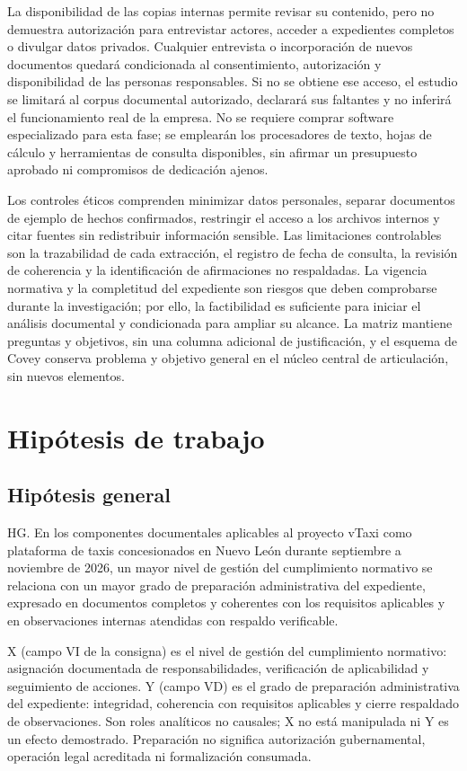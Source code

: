 {La disponibilidad de las copias internas permite revisar su contenido, pero no demuestra autorización para entrevistar actores, acceder a expedientes completos o divulgar datos privados. Cualquier entrevista o incorporación de nuevos documentos quedará condicionada al consentimiento, autorización y disponibilidad de las personas responsables. Si no se obtiene ese acceso, el estudio se limitará al corpus documental autorizado, declarará sus faltantes y no inferirá el funcionamiento real de la empresa. No se requiere comprar software especializado para esta fase; se emplearán los procesadores de texto, hojas de cálculo y herramientas de consulta disponibles, sin afirmar un presupuesto aprobado ni compromisos de dedicación ajenos.


Los controles éticos comprenden minimizar datos personales, separar documentos de ejemplo de hechos confirmados, restringir el acceso a los archivos internos y citar fuentes sin redistribuir información sensible. Las limitaciones controlables son la trazabilidad de cada extracción, el registro de fecha de consulta, la revisión de coherencia y la identificación de afirmaciones no respaldadas. La vigencia normativa y la completitud del expediente son riesgos que deben comprobarse durante la investigación; por ello, la factibilidad es suficiente para iniciar el análisis documental y condicionada para ampliar su alcance. La matriz mantiene preguntas y objetivos, sin una columna adicional de justificación, y el esquema de Covey conserva problema y objetivo general en el núcleo central de articulación, sin nuevos elementos.


\section{Hipótesis de trabajo}
\subsection{Hipótesis general}
HG. En los componentes documentales aplicables al proyecto vTaxi como plataforma de taxis concesionados en Nuevo León durante septiembre a noviembre de 2026, un mayor nivel de gestión del cumplimiento normativo se relaciona con un mayor grado de preparación administrativa del expediente, expresado en documentos completos y coherentes con los requisitos aplicables y en observaciones internas atendidas con respaldo verificable.


X (campo VI de la consigna) es el nivel de gestión del cumplimiento normativo: asignación documentada de responsabilidades, verificación de aplicabilidad y seguimiento de acciones. Y (campo VD) es el grado de preparación administrativa del expediente: integridad, coherencia con requisitos aplicables y cierre respaldado de observaciones. Son roles analíticos no causales; X no está manipulada ni Y es un efecto demostrado. Preparación no significa autorización gubernamental, operación legal acreditada ni formalización consumada.


}
